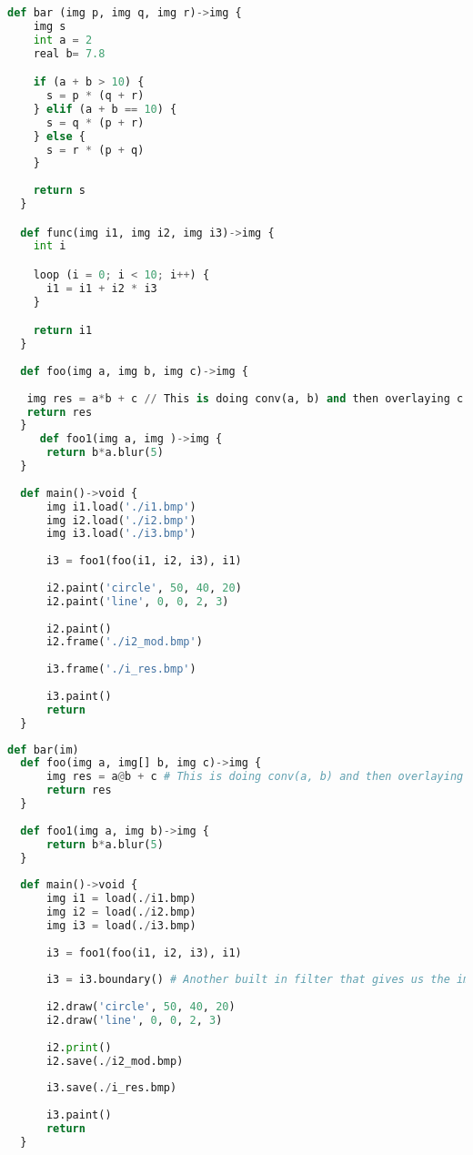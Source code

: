 \documentclass[a4paper, 11pt]{article}
\begin{document}
\begin{lstlisting}[language=Python]
  def bar (img p, img q, img r)->img {
    img s
    int a = 2
    real b= 7.8

    if (a + b > 10) {
      s = p * (q + r)
    } elif (a + b == 10) {
      s = q * (p + r)
    } else {
      s = r * (p + q)
    }
      
    return s
  }

  def func(img i1, img i2, img i3)->img {
    int i

    loop (i = 0; i < 10; i++) {
      i1 = i1 + i2 * i3
    }

    return i1
  }
  
  def foo(img a, img b, img c)->img {
   
   img res = a*b + c // This is doing conv(a, b) and then overlaying c
   return res
  }
     def foo1(img a, img )->img {
      return b*a.blur(5)
  }
  
  def main()->void {
      img i1.load('./i1.bmp')
      img i2.load('./i2.bmp')
      img i3.load('./i3.bmp')
  
      i3 = foo1(foo(i1, i2, i3), i1)
  
      i2.paint('circle', 50, 40, 20)
      i2.paint('line', 0, 0, 2, 3)
  
      i2.paint()
      i2.frame('./i2_mod.bmp')
  
      i3.frame('./i_res.bmp')
  
      i3.paint()
      return
  }
\end{lstlisting}

\begin{lstlisting}[language=Python]
  def bar(im)
  def foo(img a, img[] b, img c)->img {
      img res = a@b + c # This is doing conv(a, b) and then overlaying c
      return res
  }
  
  def foo1(img a, img b)->img {
      return b*a.blur(5)
  }
  
  def main()->void {
      img i1 = load(./i1.bmp)
      img i2 = load(./i2.bmp)
      img i3 = load(./i3.bmp)
  
      i3 = foo1(foo(i1, i2, i3), i1)
  
      i3 = i3.boundary() # Another built in filter that gives us the image boundary.
    
      i2.draw('circle', 50, 40, 20)
      i2.draw('line', 0, 0, 2, 3)
  
      i2.print()
      i2.save(./i2_mod.bmp)
  
      i3.save(./i_res.bmp)
  
      i3.paint()
      return
  }
\end{lstlisting}

\end{document}
